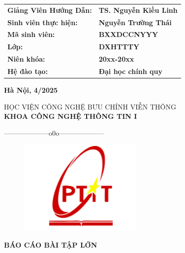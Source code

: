 \documentclass[12pt,a4paper,openany,oneside]{report}
\begin{document}
\begin{titlepage}
\begin{tabular}{ll}
	{\textbf{\large{Giảng Viên Hướng Dẫn: }}} & {\textbf{\large{TS. Nguyễn Kiều Linh}}} \\
	{\textbf{\large{Sinh viên thực hiện:}}}  & {\textbf{\large{Nguyễn Trường Thái}}} \\
	{\textbf{\large{Mã sinh viên: }}}  & {\textbf{\large{BXXDCCNYYY}}} \\
	{\textbf{\large{Lớp:}}}   & {\textbf{\large{DXHTTTY}}}\\
	{\textbf{\large{Niên khóa:}}}   & {\textbf{\large{20xx-20xx}}}\\
	{\textbf{\large{Hệ đào tạo:}}}   & {\textbf{\large{Đại học chính quy}}}
\end{tabular}

\vfill
\begin{center}
{{\bf Hà Nội, 4/2025}}
\end{center}
\end{titlepage}

\setlength{\fboxrule}{1.5pt}
\thisfancypage{\setlength{\fboxsep}{10pt}\setlength{\shadowsize}{0pt}\doublebox}{}

\fontsize{14pt}{14pt}\selectfont \baselineskip 0.65cm
\thispagestyle{empty}
\begin{center}
	{HỌC VIỆN CÔNG NGHỆ BƯU CHÍNH VIỄN THÔNG}\\
	\textbf{\MakeUppercase{KHOA CÔNG NGHỆ THÔNG TIN I}}\\
	\centerline{--------------------o0o--------------------}  
\end{center}


\begin{figure}[H]
	\begin{center}
		\includegraphics[width=6cm]{./logo}
	\end{center}
\end{figure} 

\vspace{0.5cm}
\begin{center}
	\textbf{\MakeUppercase{\LARGE \bf BÁO CÁO BÀI TẬP LỚN}}\\ 
\end{center} 
\end{document}
